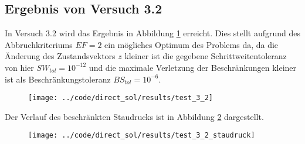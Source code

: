\subsection{Ergebnis von Versuch 3.2}\label{kap:Versuch32}
In Versuch 3.2 wird das Ergebnis in Abbildung \ref{img:test_3_2} erreicht. Dies stellt aufgrund des Abbruchkriteriums $EF = 2$ ein mögliches Optimum des Problems da, da die Änderung des Zustandsvektors $z$ kleiner ist die gegebene Schrittweitentoleranz von hier $SW_{tol} = 10^{-12}$ und die maximale Verletzung der Beschränkungen kleiner ist als Beschränkungstoleranz $BS_{tol} = 10^{-6}$.
\begin{figure}[H]
\begin{center}
\texttt{[image: ../code/direct\_sol/results/test\_3\_2]}
 \label{img:test_3_2}
\end{center}
\end{figure}
Der Verlauf des beschränkten Staudrucks ist in Abbildung \ref{img:test_3_2_staudruck} dargestellt.
\begin{figure}[H]
\begin{center}
\texttt{[image: ../code/direct\_sol/results/test\_3\_2\_staudruck]}
 \label{img:test_3_2_staudruck}
\end{center}
\end{figure}












\newpage
